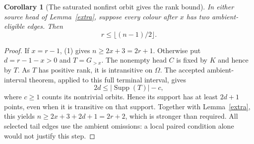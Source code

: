 \documentclass[11pt,a4paper]{article}
\newtheorem{corollary}[lemma]{Corollary}
\begin{document}
\begin{corollary}[The saturated nonfirst orbit gives the rank bound]
\label{exclude}
In either source head of Lemma~\ref{extra}, suppose every colour
after $x$ has two ambient-eligible edges. Then
\[
                        r\le\lfloor(n-1)/2\rfloor.
\]
\end{corollary}
\begin{proof}
If $x=r-1$, (1) gives $n\ge2x+3=2r+1$.
Otherwise put $d=r-1-x>0$ and $T=G_{>x}$.
The nonempty head $C$ is fixed by $K$ and hence by $T$.
As $T$ has positive rank, it is intransitive on $\Omega$.
The accepted ambient-interval theorem, applied to this full
terminal interval, gives
\[
           2d\le |\operatorname{Supp}(T)|-c,
\]
where $c\ge1$ counts its nontrivial orbits. Hence its support
has at least $2d+1$ points, even when it is transitive on that
support. Together with Lemma~\ref{extra}, this yields
$n\ge2x+3+2d+1=2r+2$, which is stronger than required.
All selected tail edges use the ambient omissions: a local
paired condition alone would not justify this step.
\end{proof}
\end{document}
